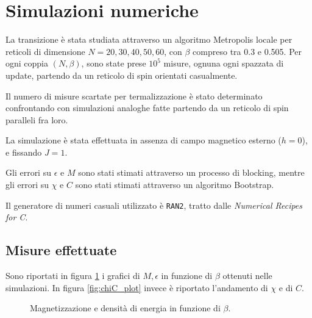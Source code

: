 \documentclass[a4paper,11pt]{article}
\newcommand{\code}[1]{\texttt{#1}}
\begin{document}
	\section{Simulazioni numeriche}

	La transizione è stata studiata attraverso un algoritmo Metropolis locale per
	reticoli di dimensione $N = 20,30,40,50,60$, con $\beta$ compreso tra 0.3 e
	0.505. Per ogni coppia $(N, \beta )$,
	sono state prese $10^{5}$ misure, ognuna ogni spazzata di update, partendo da un reticolo di spin orientati casualmente. 
	
	Il numero di misure scartate per termalizzazione è stato determinato confrontando con simulazioni analoghe fatte partendo da un reticolo di spin paralleli fra loro.

	La simulazione è stata effettuata in assenza di campo magnetico esterno
	($h = 0$), e fissando $J = 1$.

	Gli errori su $\epsilon$ e $M$ sono stati
	stimati attraverso un processo di blocking, mentre gli errori su $\chi$ e $C$ sono stati stimati attraverso un algoritmo Bootstrap.

	Il generatore di numeri casuali utilizzato è \code{RAN2}, tratto dalle \emph{Numerical Recipes for C}.
	
	\subsection{Misure effettuate}
	
	Sono riportati in figura \ref{fig:em_plot} i grafici di $M, \epsilon$ in funzione di $\beta$ ottenuti nelle simulazioni. In figura \ref{fig:chiC_plot} invece è riportato l'andamento di $\chi$ e di $C$.
	
	\begin{figure}[htb]
        \caption{Magnetizzazione e densità di energia in funzione di $\beta$.}
        \label{fig:em_plot}
	\end{figure}
	
\end{document}
